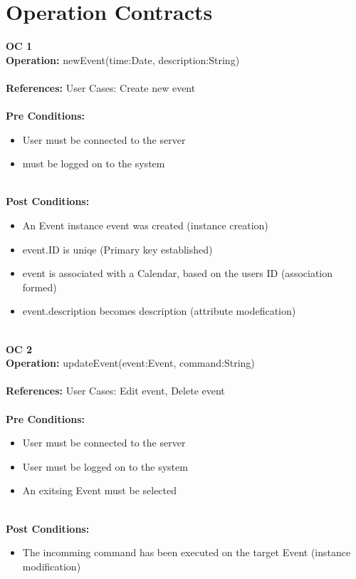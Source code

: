 \documentclass[a4paper,10pt,titlepage]{article}
\begin{document}
\section{Operation Contracts}
	\textbf{OC 1} \\
	\textbf{Operation:}	newEvent(time:Date, description:String)
	\\ \\
	\textbf{References:}	User Cases:	Create new event
	\\ \\
	\textbf{Pre Conditions:}	
	\begin{itemize}	
					\item	User must be connected to the server
					\item must be logged on to the system
					\\ \\
	\end{itemize}
	\textbf{Post Conditions:}	
	\begin{itemize}	
				\item	An Event instance event was created (instance creation)
				\item	event.ID is uniqe (Primary key established)
				\item	event is associated with a Calendar, based on the users ID (association formed)
				\item	event.description becomes description (attribute modefication)	
					\\ \\	
	\end{itemize}
	\textbf{OC 2} \\
	\textbf{Operation:}	updateEvent(event:Event, command:String)
	\\ \\
	\textbf{References:}	User Cases:	Edit event, Delete event
	\\ \\
	\textbf{Pre Conditions:}
	\begin{itemize}	
				\item	User must be connected to the server
				\item	User must be logged on to the system
				\item	An exitsing Event must be selected
	\\ \\	
	\end{itemize}
	\textbf{Post Conditions:}
	\begin{itemize}	
				\item	The incomming command has been executed on the target Event (instance modification)
				\\ \\
	\end{itemize}
					
\end{document}
